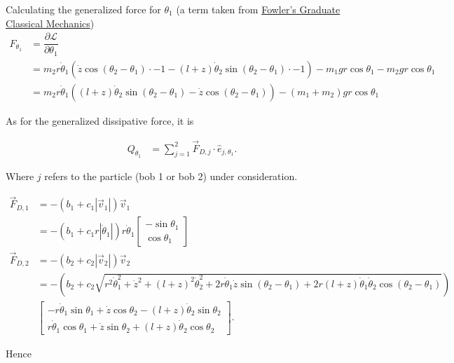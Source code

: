 \documentclass[12pt,a4paper,portrait]{article}
\newcommand{\lag}{\mathcal{L}}
\begin{document}
\begin{landscape}
Calculating the generalized force for $\theta_1$ (a term taken from \href{https://phys.libretexts.org/Bookshelves/Classical_Mechanics/Graduate_Classical_Mechanics_(Fowler)/04%3A_Hamilton's_Principle_and_Noether's_Theorem/4.05%3A_Generalized_Momenta_and_Forces}{Fowler's Graduate Classical Mechanics})
\begin{align*}
	 F_{\theta_1} &= \dfrac{\partial \lag}{\partial \theta_1} \\
	 &= m_2 r \dot{\theta}_1(\dot{z}\cos{(\theta_2-\theta_1)}\cdot -1 -(l+z)\dot{\theta}_2 \sin{(\theta_2-\theta_1)}\cdot -1) - m_1gr \cos{\theta_1} - m_2gr\cos{\theta_1} \\
	 &= m_2 r\dot{\theta}_1((l+z)\dot{\theta}_2 \sin{(\theta_2-\theta_1)}-\dot{z}\cos{(\theta_2-\theta_1)}) -(m_1+m_2)gr\cos{\theta_1}
\end{align*}

As for the generalized dissipative force, it is

\begin{align*}
	Q_{\theta_1} &= \sum_{j=1}^2 \vec{F}_{D,j} \cdot \hat{e}_{j, \theta_1}.
\end{align*}

Where $j$ refers to the particle (bob 1 or bob 2) under consideration. 

\begin{align*}
	\vec{F}_{D, 1} &= -(b_1+c_1|\vec{v}_1|)\vec{v}_1 \\
	&= -(b_1+c_1r|\dot{\theta}_1|)r\dot{\theta}_1 \begin{bmatrix}
		-\sin{\theta}_1 \\
		\cos{\theta}_1
	\end{bmatrix} \\
	\vec{F}_{D, 2} &= -(b_2+c_2|\vec{v}_2|)\vec{v}_2 \\
	&= -\left(b_2+c_2\sqrt{r^2 \dot{\theta}_1^2 + \dot{z}^2 + (l+z)^2\dot{\theta}_2^2 + 2r\dot{\theta}_1 \dot{z} \sin{(\theta_2-\theta_1)} + 2r(l+z)\dot{\theta}_1\dot{\theta}_2\cos{(\theta_2 - \theta_1)}}\right)\\
	&\begin{bmatrix}
		-r \dot{\theta}_1 \sin{\theta_1} + \dot{z} \cos{\theta_2}-(l+z)\dot{\theta}_2 \sin{\theta_2} \\
		r \dot{\theta}_1 \cos{\theta_1} + \dot{z} \sin{\theta_2}+(l+z)\dot{\theta}_2 \cos{\theta_2}
	\end{bmatrix}.
\end{align*}

Hence


\end{landscape}
\end{document}
